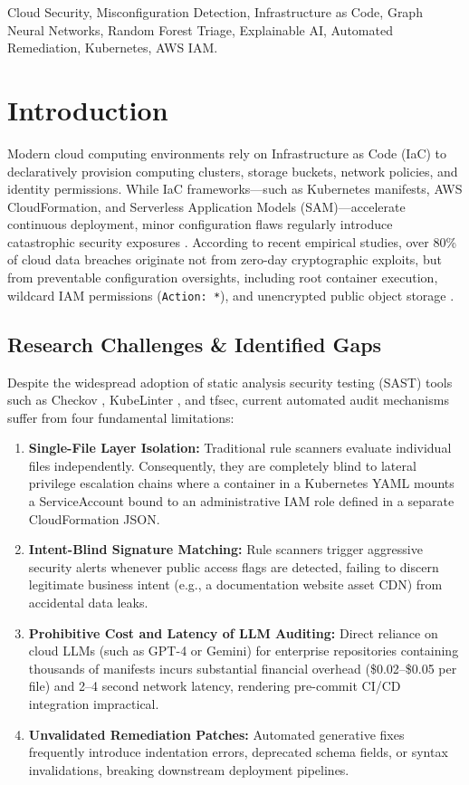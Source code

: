 \documentclass[conference]{IEEEtran}
\begin{document}
\begin{IEEEkeywords}
Cloud Security, Misconfiguration Detection, Infrastructure as Code, Graph Neural Networks, Random Forest Triage, Explainable AI, Automated Remediation, Kubernetes, AWS IAM.
\end{IEEEkeywords}

\section{Introduction}
Modern cloud computing environments rely on Infrastructure as Code (IaC) to declaratively provision computing clusters, storage buckets, network policies, and identity permissions. While IaC frameworks—such as Kubernetes manifests, AWS CloudFormation, and Serverless Application Models (SAM)—accelerate continuous deployment, minor configuration flaws regularly introduce catastrophic security exposures \cite{csa2023topthreats, rahman2019iac}. According to recent empirical studies, over 80\% of cloud data breaches originate not from zero-day cryptographic exploits, but from preventable configuration oversights, including root container execution, wildcard IAM permissions (\texttt{Action: *}), and unencrypted public object storage \cite{kumara2021iacvuln}.

\subsection{Research Challenges \& Identified Gaps}
Despite the widespread adoption of static analysis security testing (SAST) tools such as Checkov \cite{bridgecrew2022checkov}, KubeLinter \cite{sharma2021kubelinter}, and tfsec, current automated audit mechanisms suffer from four fundamental limitations:
\begin{enumerate}
    \item \textbf{Single-File Layer Isolation:} Traditional rule scanners evaluate individual files independently. Consequently, they are completely blind to lateral privilege escalation chains where a container in a Kubernetes YAML mounts a ServiceAccount bound to an administrative IAM role defined in a separate CloudFormation JSON.
    \item \textbf{Intent-Blind Signature Matching:} Rule scanners trigger aggressive security alerts whenever public access flags are detected, failing to discern legitimate business intent (e.g., a documentation website asset CDN) from accidental data leaks.
    \item \textbf{Prohibitive Cost and Latency of LLM Auditing:} Direct reliance on cloud LLMs (such as GPT-4 or Gemini) for enterprise repositories containing thousands of manifests incurs substantial financial overhead (\$0.02--\$0.05 per file) and 2--4 second network latency, rendering pre-commit CI/CD integration impractical.
    \item \textbf{Unvalidated Remediation Patches:} Automated generative fixes frequently introduce indentation errors, deprecated schema fields, or syntax invalidations, breaking downstream deployment pipelines.
\end{enumerate}
\end{document}
